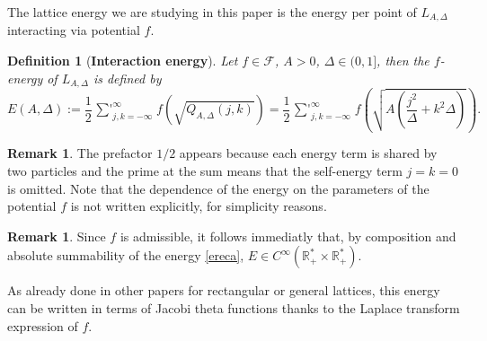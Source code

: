 \documentclass[12pt]{interact}
\def\xsum{\mathop{\sum\nolimits'}}
\newtheorem{defi}[thm]{Definition}
\theoremstyle{definition}
\newtheorem{remark}[thm]{Remark}
\newcommand{\R}{\mathbb R}
\begin{document}
The lattice energy we are studying in this paper is the energy per point of $L_{A,\Delta}$ interacting via potential $f$.

\begin{defi}[\textbf{Interaction energy}]
Let $f\in \mathcal{F}$, $A>0$, $\Delta\in (0,1]$, then the $f$-energy of $L_{A,\Delta}$ is defined by
\begin{equation} \label{ereca}
E(A,\Delta):=\frac{1}{2} \xsum_{j,k=-\infty}^{\infty}
f\left(\sqrt{Q_{A,\Delta}(j,k)} \right)=\frac{1}{2} \xsum_{j,k=-\infty}^{\infty}
f \left( \sqrt{A \left( \frac{j^2}{\Delta} + k^2\Delta \right)} \right).
\end{equation}
\end{defi}
\begin{remark}
The prefactor $1/2$ appears because each energy term is shared by two particles and the prime at the sum means that the self-energy term $j=k=0$ is omitted. Note that the dependence of the energy on the parameters of the potential $f$ is not written explicitly, for simplicity reasons.
\end{remark}


\begin{remark}\label{regularity}
Since $f$ is admissible, it follows immediatly that, by composition and absolute summability of the energy \eqref{ereca}, $E\in C^{\infty}(\R_+^*\times \R_+^*)$.
\end{remark}


As already done in other papers \cite{Bet16,Faulhuber17} for rectangular or general lattices, this energy can be written in terms of Jacobi theta functions thanks to the Laplace transform expression of $f$.
\end{document}

